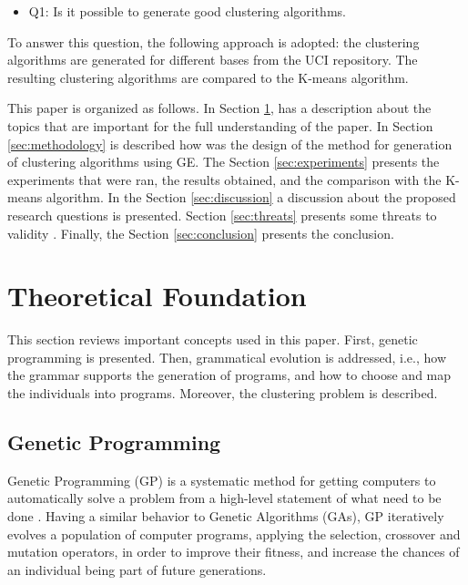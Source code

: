 \documentclass[journal]{IEEEtran}
\begin{document}
	\begin{itemize}
		\item Q1: Is it possible to generate good clustering algorithms.
	\end{itemize}
	
	To answer this question, the following approach is adopted: the clustering algorithms are generated for different bases from the UCI repository. The resulting clustering algorithms are  compared to the K-means algorithm. 
	
	This paper is organized as follows. In Section \ref{sec:theoretical_foudation}, has a description about the topics that are important for the full understanding of the paper. In Section \ref{sec:methodology} is described how was the design of the method for generation of clustering algorithms using GE. The Section \ref{sec:experiments} presents the experiments that were ran, the results obtained, and the comparison with the K-means algorithm. In the Section \ref{sec:discussion} a discussion about the proposed research questions is presented. Section \ref{sec:threats} presents some threats to validity . Finally, the Section \ref{sec:conclusion} presents the conclusion.
	
	
	\section{Theoretical Foundation} \label{sec:theoretical_foudation}
	
	This section reviews important concepts used in this paper. First, genetic programming is presented. Then, grammatical evolution is addressed, i.e., how the grammar supports the generation of programs, and how to choose and map the individuals into programs. Moreover, the clustering problem is described.
	
	\subsection{Genetic Programming}
	
	Genetic Programming (GP) is a systematic method for getting computers to automatically solve a problem from a high-level statement of what need to be done \cite{koza2005genetic}. Having a similar behavior to Genetic Algorithms (GAs), GP iteratively evolves a population of computer programs, applying the selection, crossover and mutation operators, in order to improve their fitness, and increase the chances of an individual being part of future generations.
	
\end{document}
